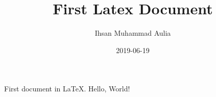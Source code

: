 \documentclass{article}
\title{First Latex Document}
\date{2019-06-19}
\author{Ihsan Muhammad Aulia}
\begin{document}
  \maketitle
  \newpage

  First document in \LaTeX.
  Hello, World!
\end{document}
